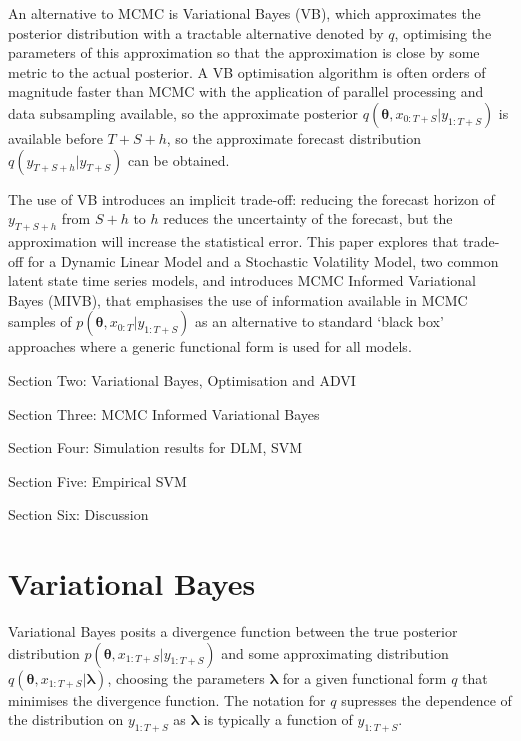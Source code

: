 \documentclass[12pt,a4paper]{article}%
\numberwithin{equation}{section}
\begin{document}
{{An alternative to MCMC is Variational Bayes (VB), which approximates the posterior distribution with a tractable alternative denoted by $q$, optimising the parameters of this approximation so that the approximation is close by some metric to the actual posterior. A VB optimisation algorithm is often orders of magnitude faster than MCMC with the application of parallel processing and data subsampling available, so the approximate posterior $q(\boldsymbol{\theta}, x_{0:T+S} | y_{1:T+S})$ is available before $T+S+h$, so the approximate forecast distribution $q(y_{T+S+h} | y_{T+S})$ can be obtained.

The use of VB introduces an implicit trade-off: reducing the forecast horizon of $y_{T+S+h}$ from $S+h$ to $h$ reduces the uncertainty of the forecast, but the approximation will increase the statistical error. This paper explores that trade-off for a Dynamic Linear Model and a Stochastic Volatility Model, two common latent state time series models, and introduces MCMC Informed Variational Bayes (MIVB), that emphasises the use of information available in MCMC samples of $p(\boldsymbol{\theta}, x_{0:T} | y_{1:T+S})$ as an alternative to standard `black box' approaches where a generic functional form is used for all models.

\begin{itemise}
\item Section Two: Variational Bayes, Optimisation and ADVI
\item Section Three: MCMC Informed Variational Bayes
\item Section Four: Simulation results for DLM, SVM
\item Section Five: Empirical SVM
\item Section Six: Discussion
\end{itemise}

\section{Variational Bayes}
\label{VB}
Variational Bayes posits a divergence function between the true posterior distribution $p(\boldsymbol{\theta}, x_{1:T+S} | y_{1:T+S})$ and some approximating distribution $q(\boldsymbol{\theta}, x_{1:T+S} | \boldsymbol{\lambda})$, choosing the parameters $\boldsymbol{\lambda}$ for a given functional form $q$ that minimises the divergence function. The notation for $q$ supresses the dependence of the distribution on $y_{1:T+S}$ as $\boldsymbol{\lambda}$ is typically a function of $y_{1:T+S}$.

}}
\end{document}
